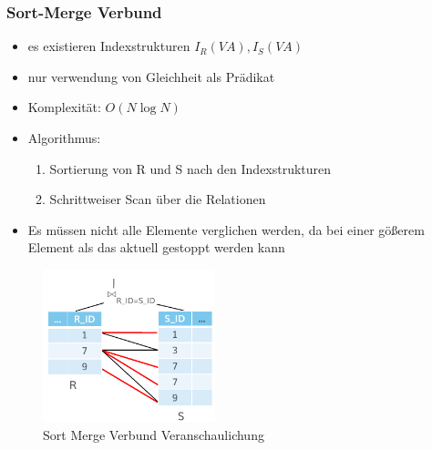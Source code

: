 \documentclass[a4paper]{article}
\begin{document}
    \subsubsection{Sort-Merge Verbund}
    \begin{itemize}
        \item es existieren Indexstrukturen $I_R(VA) , I_S(VA)$
        \item nur verwendung von Gleichheit als Prädikat
        \item Komplexität: $O(N \log N)$
        \item Algorithmus: 
        \begin{enumerate}
            \item Sortierung von R und S nach den Indexstrukturen
            \item Schrittweiser Scan über die Relationen
        \end{enumerate}
        \item Es müssen nicht alle Elemente verglichen werden, da bei einer gößerem Element als das aktuell gestoppt werden kann
    \end{itemize}
    \begin{figure}[htp]
        \centering
        \includegraphics[width=5cm]{images/Sort-Merge.png}
        \caption{Sort Merge Verbund Veranschaulichung}
        \label{fig:SortMerge}
    \end{figure}
    
\end{document}

